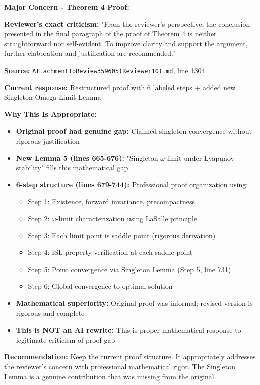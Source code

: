 \documentclass[11pt]{article}
\begin{document}
\textbf{Major Concern - Theorem 4 Proof:}

\textbf{Reviewer's exact criticism:} "From the reviewer's perspective, the conclusion presented in the final paragraph of the proof of Theorem 4 is neither straightforward nor self-evident. To improve clarity and support the argument, further elaboration and justification are recommended."

\textbf{Source:} \texttt{AttachmentToReview359605(Reviewer10).md}, line 1304

\textbf{Current response:} Restructured proof with 6 labeled steps + added new Singleton Omega-Limit Lemma

\textbf{\textcolor{success}{Why This Is Appropriate:}}
\begin{itemize}[leftmargin=*]
\item \textbf{Original proof had genuine gap:} Claimed singleton convergence without rigorous justification
\item \textbf{New Lemma 5 (lines 665-676):} "Singleton $\omega$-limit under Lyapunov stability" fills this mathematical gap
\item \textbf{6-step structure (lines 679-744):} Professional proof organization using:
  \begin{itemize}
  \item Step 1: Existence, forward invariance, precompactness
  \item Step 2: $\omega$-limit characterization using LaSalle principle
  \item Step 3: Each limit point is saddle point (rigorous derivation)
  \item Step 4: ISL property verification at each saddle point
  \item Step 5: Point convergence via Singleton Lemma (Step 5, line 731)
  \item Step 6: Global convergence to optimal solution
  \end{itemize}
\item \textbf{Mathematical superiority:} Original proof was informal; revised version is rigorous and complete
\item \textbf{This is NOT an AI rewrite:} This is proper mathematical response to legitimate criticism of proof gap
\end{itemize}

\textbf{Recommendation:} Keep the current proof structure. It appropriately addresses the reviewer's concern with professional mathematical rigor. The Singleton Lemma is a genuine contribution that was missing from the original.
\end{document}

